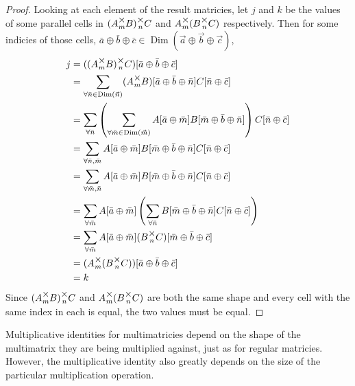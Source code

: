 \documentclass[12pt]{article}
\theoremstyle{definition}
\theoremstyle{case}
\theoremstyle{ppart}
\DeclareMathOperator{\Dim}{Dim}
\newcommand{\mmult}[1]{\text{\raisebox{1ex}{$\underset{#1}{\times}$}}}
\begin{document}
\begin{proof}
Looking at each element of the result matricies, let $j$ and $k$ be the values
of some parallel cells in $(A \mmult{m} B) \mmult{n} C$ and
$A \mmult{m} (B \mmult{n} C)$ respectively. Then for some indicies of those cells,
$\bar{a} \oplus \bar{b} \oplus \bar{c} \in
\Dim(\vec{a} \oplus \vec{b} \oplus \vec{c})$,
\begin{align*}
 j
 &= ((A \mmult{m} B) \mmult{n} C)[\bar{a} \oplus \bar{b} \oplus \bar{c}] \\
 &= \sum_{\forall \bar{n} \in \Dim(\vec{n})}
 (A \mmult{m} B)[\bar{a} \oplus \bar{b} \oplus \bar{n}]
 C[\bar{n} \oplus \bar{c}] \\
 &= \sum_{\forall \bar{n}}
 \left(
  \sum_{\forall \bar{m} \in \Dim(\vec{m})}
	A[\bar{a} \oplus \bar{m}]B[\bar{m} \oplus \bar{b} \oplus \bar{n}]
 \right)
 C[\bar{n} \oplus \bar{c}] \\
 &= \sum_{\forall \bar{n}, \bar{m}}
 A[\bar{a} \oplus \bar{m}]
 B[\bar{m} \oplus \bar{b} \oplus \bar{n}]
 C[\bar{n} \oplus \bar{c}] \\
 &= \sum_{\forall \bar{m}, \bar{n}}
 A[\bar{a} \oplus \bar{m}]
 B[\bar{m} \oplus \bar{b} \oplus \bar{n}]
 C[\bar{n} \oplus \bar{c}] \\
 &= \sum_{\forall \bar{m}}
 A[\bar{a} \oplus \bar{m}]
 \left(
 \sum_{\forall \bar{n}}
  B[\bar{m} \oplus \bar{b} \oplus \bar{n}]
  C[\bar{n} \oplus \bar{c}]
 \right) \\
 &= \sum_{\forall \bar{m}}
 A[\bar{a} \oplus \bar{m}]
 (B \mmult{n} C)[\bar{m} \oplus \bar{b} \oplus \bar{c}] \\
 &= (A \mmult{m} (B \mmult{n} C))[\bar{a} \oplus \bar{b} \oplus \bar{c}] \\
 &= k
\end{align*}
Since $(A \mmult{m} B) \mmult{n} C$ and $A \mmult{m} (B \mmult{n} C)$ are both
the same shape and every cell with the same index in each is equal, the two
values must be equal.
\end{proof}

Multiplicative identities for multimatricies depend on the shape of the
multimatrix they are being multiplied against, just as for regular matricies.
However, the multiplicative identity also greatly depends on the size of
the particular multiplication operation. 
\end{document}
